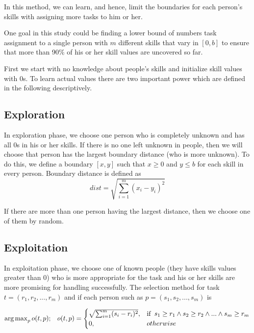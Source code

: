 \documentclass[]{article}
\begin{document}
In this method, we can learn, and hence, limit the boundaries for each person's skills with assigning more tasks to him or her.

One goal in this study could be finding a lower bound of numbers task assignment to a single person with $m$ different skills that vary in $[0, b]$ to ensure that more than 90\% of his or her skill values are uncovered so far.

First we start with no knowledge about people's skills and initialize skill values with 0s. To learn actual values there are two important power which are defined in the following descriptively.

\subsection{Exploration}
In exploration phase, we choose one person who is completely unknown and has all 0s in his or her skills. If there is no one left unknown in people, then we will choose that person has the largest boundary distance (who is more unknown). To do this, we define a boundary $[x,y]$ such that $x\geq 0$ and $y\leq b$ for each skill in every person. Boundary distance is defined as
\begin{equation}
	dist = \sqrt{\sum_{i=1}^{m}(x_i-y_i)^2}
\end{equation}

If there are more than one person having the largest distance, then we choose one of them by random.

\subsection{Exploitation}
In exploitation phase, we choose one of known people (they have skills values greater than 0) who is more appropriate for the task and his or her skills are more promising for handling successfully. The selection method for task $t=(r_1, r_2, ..., r_m)$ and if each person such as $p=(s_1, s_2, ..., s_m) $ is

\begin{equation}
	\operatorname{arg\,max}_p o(t,p);\;\;\;
	o(t,p) = 
	\begin{cases}
		\sqrt{\sum_{i=1}^{m}(s_i-r_i)^2},	& \text{if\;\;} s_1 \geq r_1 \wedge s_2 \geq r_2 \wedge ... \wedge s_m \geq r_m\\
		0,	& otherwise
	\end{cases}
\end{equation}
\end{document}
